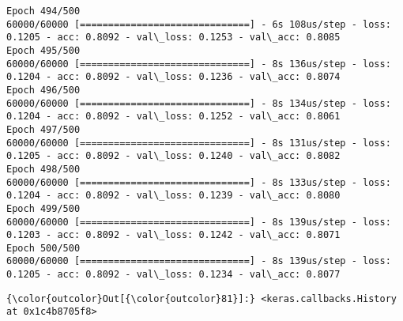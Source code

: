\documentclass[11pt]{article}
\begin{document}
\begin{Verbatim}[commandchars=\\\{\}]
Epoch 494/500
60000/60000 [==============================] - 6s 108us/step - loss: 0.1205 - acc: 0.8092 - val\_loss: 0.1253 - val\_acc: 0.8085
Epoch 495/500
60000/60000 [==============================] - 8s 136us/step - loss: 0.1204 - acc: 0.8092 - val\_loss: 0.1236 - val\_acc: 0.8074
Epoch 496/500
60000/60000 [==============================] - 8s 134us/step - loss: 0.1204 - acc: 0.8092 - val\_loss: 0.1252 - val\_acc: 0.8061
Epoch 497/500
60000/60000 [==============================] - 8s 131us/step - loss: 0.1205 - acc: 0.8092 - val\_loss: 0.1240 - val\_acc: 0.8082
Epoch 498/500
60000/60000 [==============================] - 8s 133us/step - loss: 0.1204 - acc: 0.8092 - val\_loss: 0.1239 - val\_acc: 0.8080
Epoch 499/500
60000/60000 [==============================] - 8s 139us/step - loss: 0.1203 - acc: 0.8092 - val\_loss: 0.1242 - val\_acc: 0.8071
Epoch 500/500
60000/60000 [==============================] - 8s 139us/step - loss: 0.1205 - acc: 0.8092 - val\_loss: 0.1234 - val\_acc: 0.8077

    \end{Verbatim}

\begin{Verbatim}[commandchars=\\\{\}]
{\color{outcolor}Out[{\color{outcolor}81}]:} <keras.callbacks.History at 0x1c4b8705f8>
\end{Verbatim}
            
\end{document}
